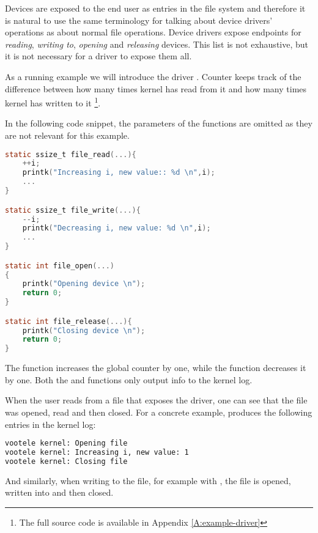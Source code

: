 \documentclass[..thesis.tex]{subfiles}
\begin{document}
Devices are exposed to the end user as entries in the file system and therefore it is natural
to use the same terminology for talking about device drivers' operations as about normal file operations.
Device drivers expose endpoints for \textit{reading}, \textit{writing to}, \textit{opening} and \textit{releasing} devices.
This list is not exhaustive\cite[include/linux/fs.h]{torvalds_linux}, but it is not necessary for a driver to expose them all.

As a running example we will introduce the driver .
Counter keeps track of the difference between how many times kernel has read from it and how many times kernel has written to it
\footnote{The full source code is available in Appendix \ref{A:example-driver}}.

In the following code snippet, the parameters of the functions are omitted as they are not relevant for this example.



\begin{lstlisting}[language=C,style=def]
static ssize_t file_read(...){
    ++i;
    printk("Increasing i, new value:: %d \n",i);
    ...
}

static ssize_t file_write(...){
    --i;
    printk("Decreasing i, new value: %d \n",i);
    ...
}

static int file_open(...)
{
    printk("Opening device \n");
    return 0;
}

static int file_release(...){
    printk("Closing device \n");
    return 0;
}


\end{lstlisting}

The  function increases the global counter by one, while the  function decreases it by one.
Both the  and  functions only output info to the kernel log.

When the user reads from a file that exposes the driver, one can see that the file was opened, read and then closed. For a concrete example,
 produces the following entries in the kernel log:

\begin{lstlisting}[language=sh,style=def]
vootele kernel: Opening file 
vootele kernel: Increasing i, new value: 1 
vootele kernel: Closing file 
\end{lstlisting}

And similarly, when writing to the file, for example with , the file is opened, written into and then closed.
\end{document}
